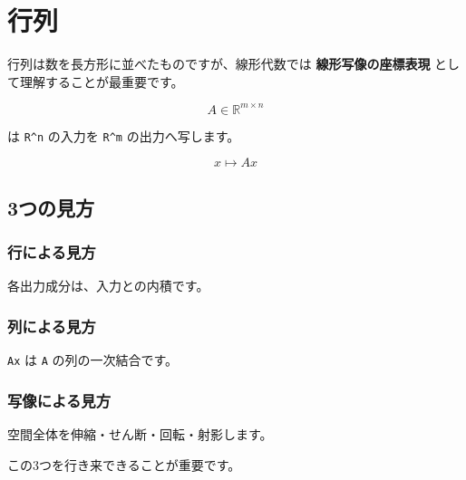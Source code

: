 \documentclass[
  11pt,
  a4paper,
]{ltjsarticle}
\author{}
\date{}
\begin{document}
\hypertarget{ux884cux5217}{%
\section{行列}\label{ux884cux5217}}

行列は数を長方形に並べたものですが、線形代数では
\textbf{線形写像の座標表現} として理解することが最重要です。

\[
A\in\mathbb{R}^{m\times n}
\]

は \texttt{R\^{}n} の入力を \texttt{R\^{}m} の出力へ写します。

\[
x\mapsto Ax
\]

\hypertarget{ux3064ux306eux898bux65b9}{%
\subsection{3つの見方}\label{ux3064ux306eux898bux65b9}}

\hypertarget{ux884cux306bux3088ux308bux898bux65b9}{%
\subsubsection{行による見方}\label{ux884cux306bux3088ux308bux898bux65b9}}

各出力成分は、入力との内積です。

\hypertarget{ux5217ux306bux3088ux308bux898bux65b9}{%
\subsubsection{列による見方}\label{ux5217ux306bux3088ux308bux898bux65b9}}

\texttt{Ax} は \texttt{A} の列の一次結合です。

\hypertarget{ux5199ux50cfux306bux3088ux308bux898bux65b9}{%
\subsubsection{写像による見方}\label{ux5199ux50cfux306bux3088ux308bux898bux65b9}}

空間全体を伸縮・せん断・回転・射影します。

この3つを行き来できることが重要です。
\end{document}
